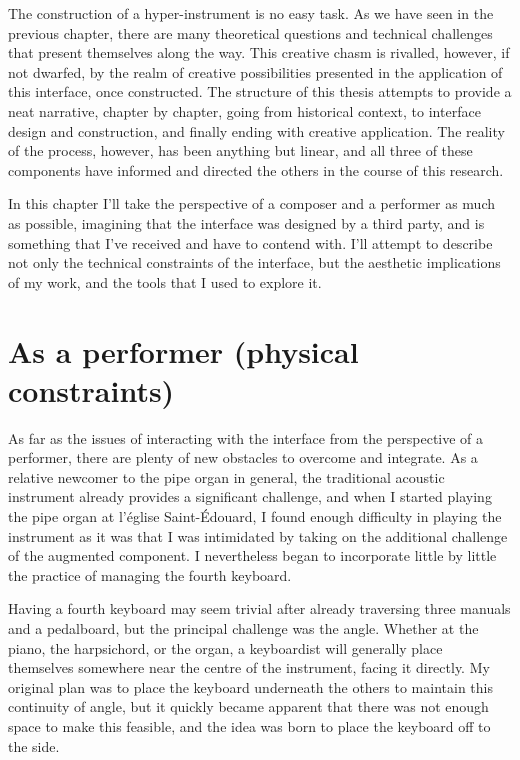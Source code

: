 \documentclass[12pt,twoside,maitrise]{dms_ks}
\theoremstyle{definition}
\begin{document}
{The construction of a hyper-instrument is no easy task.
As we have seen in the previous chapter, there are many theoretical questions and technical challenges that present themselves along the way.
This creative chasm is rivalled, however, if not dwarfed, by the realm of creative possibilities presented in the application of this interface, once constructed.
The structure of this thesis attempts to provide a neat narrative, chapter by chapter, going from historical context, to interface design and construction, and finally ending with creative application.
The reality of the process, however, has been anything but linear, and all three of these components have informed and directed the others in the course of this research.

In this chapter I’ll take the perspective of a composer and a performer as much as possible, imagining that the interface was designed by a third party, and is something that I’ve received and have to contend with.
I’ll attempt to describe not only the technical constraints of the interface, but the aesthetic implications of my work, and the tools that I used to explore it.

\section{As a performer (physical constraints)}

As far as the issues of interacting with the interface from the perspective of a performer, there are plenty of new obstacles to overcome and integrate. 
As a relative newcomer to the pipe organ in general, the traditional acoustic instrument already provides a significant challenge, and when I started playing the pipe organ at l’église Saint-Édouard, I found enough difficulty in playing the instrument as it was that I was intimidated by taking on the additional challenge of the augmented component. 
I nevertheless began to incorporate little by little the practice of managing the fourth keyboard. 

Having a fourth keyboard may seem trivial after already traversing three manuals and a pedalboard, but the principal challenge was the angle. 
Whether at the piano, the harpsichord, or the organ, a keyboardist will generally place themselves somewhere near the centre of the instrument, facing it directly. 
My original plan was to place the keyboard underneath the others to maintain this continuity of angle, but it quickly became apparent that there was not enough space to make this feasible, and the idea was born to place the keyboard off to the side. 

}
\end{document}

